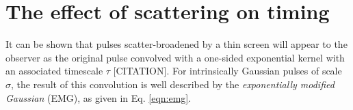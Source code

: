 \documentclass[preprint2,linenumbers]{aastex631}
\begin{document}
%






\appendix

\section{The effect of scattering on timing}
\label{app:scattering_dm}

It can be shown that pulses scatter-broadened by a thin screen will appear to the observer as the original pulse convolved with a one-sided exponential kernel with an associated timescale $\tau$ [CITATION].
For intrinsically Gaussian pulses of scale $\sigma$, the result of this convolution is well described by the \textit{exponentially modified Gaussian} (EMG), as given in Eq. \eqref{eqn:emg}.
\end{document}
